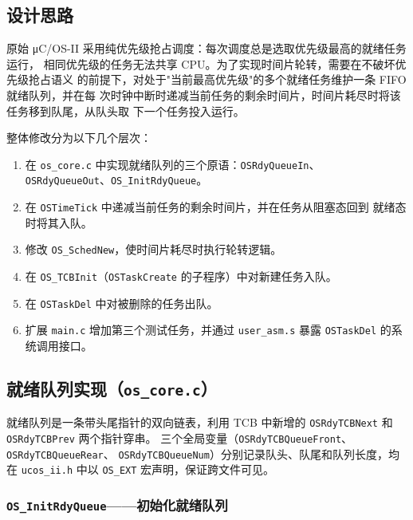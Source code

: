 \documentclass[12pt,a4paper]{article}
\begin{document}
\subsection{设计思路}

原始 μC/OS-II 采用纯优先级抢占调度：每次调度总是选取优先级最高的就绪任务运行，
相同优先级的任务无法共享 CPU。为了实现时间片轮转，需要在不破坏优先级抢占语义
的前提下，对处于"当前最高优先级"的多个就绪任务维护一条 FIFO 就绪队列，并在每
次时钟中断时递减当前任务的剩余时间片，时间片耗尽时将该任务移到队尾，从队头取
下一个任务投入运行。

整体修改分为以下几个层次：

\begin{enumerate}
  \item 在 \texttt{os\_core.c} 中实现就绪队列的三个原语：\texttt{OSRdyQueueIn}、
        \texttt{OSRdyQueueOut}、\texttt{OS\_InitRdyQueue}。
  \item 在 \texttt{OSTimeTick} 中递减当前任务的剩余时间片，并在任务从阻塞态回到
        就绪态时将其入队。
  \item 修改 \texttt{OS\_SchedNew}，使时间片耗尽时执行轮转逻辑。
  \item 在 \texttt{OS\_TCBInit}（\texttt{OSTaskCreate} 的子程序）中对新建任务入队。
  \item 在 \texttt{OSTaskDel} 中对被删除的任务出队。
  \item 扩展 \texttt{main.c} 增加第三个测试任务，并通过 \texttt{user\_asm.s}
        暴露 \texttt{OSTaskDel} 的系统调用接口。
\end{enumerate}

\subsection{就绪队列实现（\texttt{os\_core.c}）}

就绪队列是一条带头尾指针的双向链表，利用 TCB 中新增的
\texttt{OSRdyTCBNext} 和 \texttt{OSRdyTCBPrev} 两个指针穿串。
三个全局变量（\texttt{OSRdyTCBQueueFront}、\texttt{OSRdyTCBQueueRear}、
\texttt{OSRdyTCBQueueNum}）分别记录队头、队尾和队列长度，均在
\texttt{ucos\_ii.h} 中以 \texttt{OS\_EXT} 宏声明，保证跨文件可见。

\subsubsection{\texttt{OS\_InitRdyQueue}——初始化就绪队列}
\end{document}
